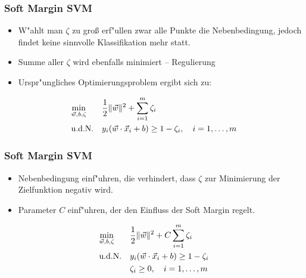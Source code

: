 
\begin{frame}

\frametitle{Soft Margin SVM}

\begin{itemize}
	\setlength{\itemsep}{15pt}
	\item W"ahlt man $\zeta$ zu gro{\ss} erf"ullen zwar alle Punkte die Nebenbedingung, jedoch findet keine sinnvolle Klassifikation mehr statt.
	\item Summe aller $\zeta$ wird ebenfalls minimiert -- Regulierung
	\item Urspr"ungliches Optimierungsproblem ergibt sich zu:
\end{itemize}

\begin{equation}
	\begin{aligned}
		& \underset{\vec{w},b,\zeta}{\min} && \frac{1}{2} \Vert\vec{w}\Vert^2 + \sum\limits_{i=1}^m \zeta_i \notag \\
		& \textrm{u.d.N.}                  && y_i(\vec{w}\cdot\vec{x}_i+b) \geq 1-\zeta_i, \quad i=1,\ldots,m
	\end{aligned}
\end{equation}

\end{frame}






\begin{frame}

\frametitle{Soft Margin SVM}

\begin{itemize}
	\setlength{\itemsep}{15pt}
	\item Nebenbedingung einf"uhren, die verhindert, dass $\zeta$ zur Minimierung der Zielfunktion negativ wird.
	\item Parameter $C$ einf"uhren, der den Einfluss der Soft Margin regelt.
\end{itemize}

\begin{equation}
	\begin{aligned}
		& \underset{\vec{w},b,\zeta}{\min} && \frac{1}{2} \Vert\vec{w}\Vert^2 + C \sum\limits_{i=1}^m \zeta_i \notag \\
		& \textrm{u.d.N.}                  && y_i(\vec{w}\cdot\vec{x}_i+b) \geq 1-\zeta_i \\
		&								   && \zeta_i \geq 0, \quad i=1,\ldots,m
	\end{aligned}
\end{equation}

\end{frame}






